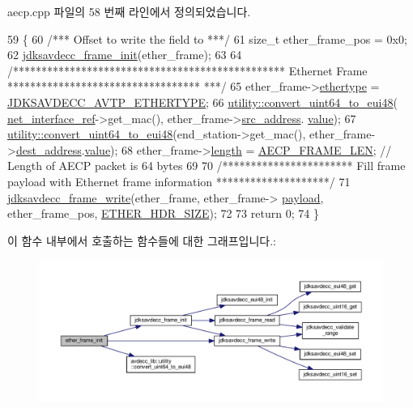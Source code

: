 aecp.\+cpp 파일의 58 번째 라인에서 정의되었습니다.


\begin{DoxyCode}
59     \{
60         \textcolor{comment}{/*** Offset to write the field to ***/}
61         \textcolor{keywordtype}{size\_t} ether\_frame\_pos = 0x0;
62         \hyperlink{group__frame_ga14d8effbd6816c69743c5be3e98fea27}{jdksavdecc\_frame\_init}(ether\_frame);
63 
64         \textcolor{comment}{/************************************************ Ethernet Frame **********************************
      ***/}
65         ether\_frame->\hyperlink{structjdksavdecc__frame_aa9296c58dc24c63c4ee927db394a97d7}{ethertype} = \hyperlink{group__pdu_ga9fe7bd6b7d7b0f92f5fdbb910068197f}{JDKSAVDECC\_AVTP\_ETHERTYPE};
66         \hyperlink{namespaceavdecc__lib_1_1utility_a723fa51b0a25cbec764d4e7fa1f5daac}{utility::convert\_uint64\_to\_eui48}(
      \hyperlink{namespaceavdecc__lib_adb4da03bc65b7846cc240ee919bbde19}{net\_interface\_ref}->get\_mac(), ether\_frame->\hyperlink{structjdksavdecc__frame_a74855d22d112da72f29ba4959ebc639b}{src\_address}.
      \hyperlink{structjdksavdecc__eui48_a18b93f04637cf37688ec10a33a0cbc26}{value});
67         \hyperlink{namespaceavdecc__lib_1_1utility_a723fa51b0a25cbec764d4e7fa1f5daac}{utility::convert\_uint64\_to\_eui48}(end\_station->get\_mac(), 
      ether\_frame->\hyperlink{structjdksavdecc__frame_a104d37031c593f66765dc66d8ac8962b}{dest\_address}.\hyperlink{structjdksavdecc__eui48_a18b93f04637cf37688ec10a33a0cbc26}{value});
68         ether\_frame->\hyperlink{structjdksavdecc__frame_a1892eba2086d12ac2b09005aeb09ea3b}{length} = \hyperlink{namespaceavdecc__lib_a2b5e266e2064669372f6c59e977c6c88af1a7d677d6d8ee66a9b7bb1f960ab1db}{AECP\_FRAME\_LEN}; \textcolor{comment}{// Length of AECP packet is 64 bytes}
69 
70         \textcolor{comment}{/*********************** Fill frame payload with Ethernet frame information ********************/}
71         \hyperlink{group__frame_gaba1e860c060886e82198907b17214aee}{jdksavdecc\_frame\_write}(ether\_frame, ether\_frame->
      \hyperlink{structjdksavdecc__frame_a220ad076814a31ae0163e722e523de46}{payload}, ether\_frame\_pos, \hyperlink{namespaceavdecc__lib_a6c827b1a0d973e18119c5e3da518e65ca9512ad9b34302ba7048d88197e0a2dc0}{ETHER\_HDR\_SIZE});
72 
73         \textcolor{keywordflow}{return} 0;
74     \}
\end{DoxyCode}


이 함수 내부에서 호출하는 함수들에 대한 그래프입니다.\+:
\nopagebreak
\begin{figure}[H]
\begin{center}
\leavevmode
\includegraphics[width=350pt]{classavdecc__lib_1_1aecp_a753653f0cfa951bd0fc08e68f94ddf25_cgraph}
\end{center}
\end{figure}


